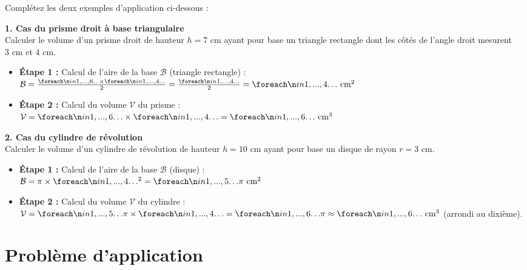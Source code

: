 \documentclass[a4paper]{book}
\begin{document}
    \begin{exemple}
        Complétez les deux exemples d'application ci-dessous :
        
        \vspace{0.2cm}
        \textbf{1. Cas du prisme droit à base triangulaire} \\
        Calculer le volume d'un prisme droit de hauteur $h = 7\text{ cm}$ ayant pour base un triangle rectangle dont les côtés de l'angle droit mesurent $3\text{ cm}$ et $4\text{ cm}$.
        \begin{itemize}
            \item[$\bullet$] \textbf{Étape 1 :} Calcul de l'aire de la base $\mathcal{B}$ (triangle rectangle) : \\
            $\mathcal{B} = \frac{\points[6] \times \points[4]}{2} = \frac{\points[4]}{2} = \points[4]\text{ cm}^2$
            \item[$\bullet$] \textbf{Étape 2 :} Calcul du volume $\mathcal{V}$ du prisme : \\
            $\mathcal{V} = \points[6] \times \points[4] = \points[6]\text{ cm}^3$
        \end{itemize}
        
        \vspace{0.4cm}
    
        \textbf{2. Cas du cylindre de révolution} \\
        Calculer le volume d'un cylindre de révolution de hauteur $h = 10\text{ cm}$ ayant pour base un disque de rayon $r = 3\text{ cm}$.
        \begin{itemize}
            \item[$\bullet$] \textbf{Étape 1 :} Calcul de l'aire de la base $\mathcal{B}$ (disque) : \\
            $\mathcal{B} = \pi \times \points[4]^2 = \points[5]\pi\text{ cm}^2$
            \item[$\bullet$] \textbf{Étape 2 :} Calcul du volume $\mathcal{V}$ du cylindre : \\
            $\mathcal{V} = \points[5]\pi \times \points[4] = \points[6]\pi \approx \points[6]\text{ cm}^3$ (arrondi au dixième).
        \end{itemize}
    \end{exemple}

\section{Problème d'application}
\end{document}
